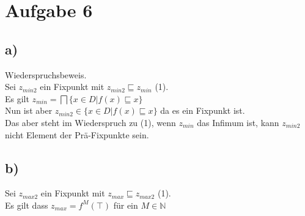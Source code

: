 \section*{Aufgabe 6}

\subsection*{a)}
Wiederspruchsbeweis.\\
Sei $z_{min2}$ ein Fixpunkt mit $z_{min2} \sqsubseteq z_{min}$ (1).\\
Es gilt $z_{min} = \bigsqcap \{x \in D | f(x) \sqsubseteq x \}$\\
Nun ist aber $z_{min2} \in \{x \in D | f(x) \sqsubseteq x \}$ da es ein Fixpunkt ist.\\
Das aber steht im Wiederspruch zu (1), wenn $z_{min}$ das Infimum ist, kann $z_{min2}$ nicht Element der Prä-Fixpunkte sein.

\subsection*{b)}

Sei $z_{max2}$ ein Fixpunkt mit $z_{max} \sqsubseteq z_{max2}$ (1).\\
Es gilt dass $z_{max} = f^M(\top)$ für ein $M \in \mathbb{N}$



